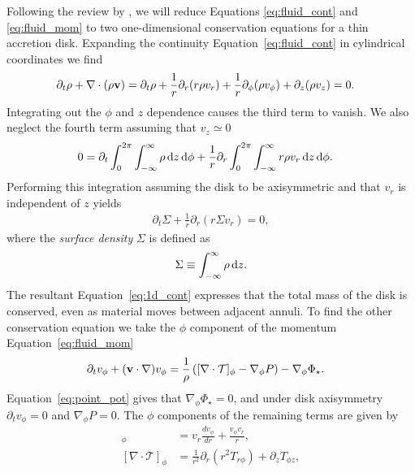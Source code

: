 Following the review by \citet{papaloizou1995}, we will reduce Equations \eqref{eq:fluid_cont} and \eqref{eq:fluid_mom} to two one-dimensional conservation equations for a thin accretion disk.
Expanding the continuity Equation~\eqref{eq:fluid_cont} in cylindrical coordinates we find
\begin{align}
    \partial_t \rho + \nabla \cdot (\rho \mathbf{v}) &= \partial_t \rho + \frac{1}{r} \partial_r (r \rho v_r) + \frac{1}{r} \partial_\phi (\rho v_\phi) + \partial_z (\rho v_z) = 0.
\end{align}
Integrating out the $\phi$ and $z$ dependence causes the third term to vanish. We also neglect the fourth term assuming that $v_z \simeq 0$
\begin{align}
    0 &= \partial_t \int_0^{2\pi} \int_{-\infty}^\infty \rho \mathop{}\!\mathrm{d}{z} \mathop{}\!\mathrm{d}{\phi} + \frac{1}{r} \partial_r \int_0^{2\pi} \int_{-\infty}^\infty r \rho v_r \mathop{}\!\mathrm{d}{z} \mathop{}\!\mathrm{d}{\phi}. \label{eq:int_cont}
\end{align}
Performing this integration assuming the disk to be axisymmetric and that $v_r$ is independent of $z$ yields
\begin{align}
    \partial_t \Sigma + \frac{1}{r} \partial_r (r \Sigma v_r) = 0, \label{eq:1d_cont}
\end{align}
where the \textit{surface density} $\Sigma$ is defined as 
\begin{align}
    \Sigma \equiv \int_{-\infty}^\infty \rho \mathop{}\!\mathrm{d}{z}. \label{eq:surf_dens_def}
\end{align} 
The resultant Equation~\eqref{eq:1d_cont} expresses that the total mass of the disk is conserved, even as material moves between adjacent annuli.
To find the other conservation equation we take the $\phi$ component of the momentum Equation~\eqref{eq:fluid_mom}
\begin{align}
    \partial_t v_\phi + (\mathbf{v} \cdot \nabla) v_\phi &= \frac{1}{\rho} \left( [\nabla \cdot \mathcal{T}]_\phi - \nabla_\phi P  \right) - \nabla_\phi \Phi_\star.
\end{align}
Equation~\eqref{eq:point_pot} gives that $\nabla_\phi \Phi_\star = 0$, and under disk axisymmetry $\partial_t v_\phi = 0$ and $\nabla_\phi P=0$.
The $\phi$ components of the remaining terms are given by
\begin{align}
    [(v \cdot \nabla) \VF{v}]_\phi &= v_r \frac{dv_\phi}{dr} + \frac{v_\phi v_r}{r}, \\
    [\nabla \cdot \mathcal{T}]_\phi &= \frac{1}{r^2} \partial_r (r^2 T_{r\phi}) + \partial_z T_{\phi z},
\end{align}
